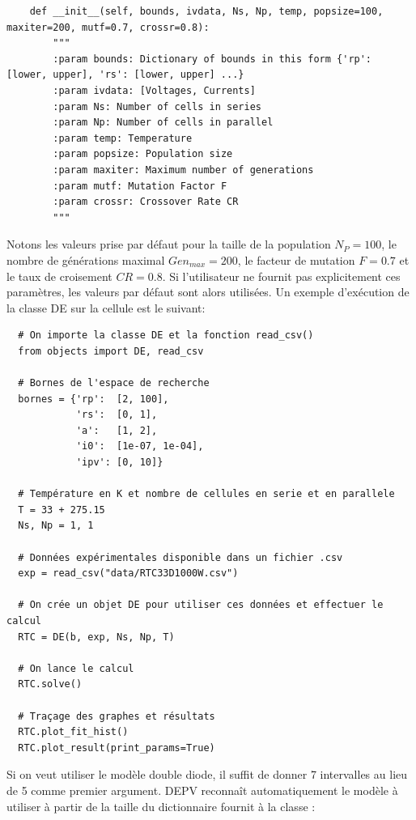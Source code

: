 \begin{verbatim}
    def __init__(self, bounds, ivdata, Ns, Np, temp, popsize=100, maxiter=200, mutf=0.7, crossr=0.8):
        """
        :param bounds: Dictionary of bounds in this form {'rp': [lower, upper], 'rs': [lower, upper] ...}
        :param ivdata: [Voltages, Currents]
        :param Ns: Number of cells in series
        :param Np: Number of cells in parallel
        :param temp: Temperature
        :param popsize: Population size
        :param maxiter: Maximum number of generations
        :param mutf: Mutation Factor F
        :param crossr: Crossover Rate CR
        """
\end{verbatim}
Notons les valeurs prise par défaut pour la taille de la population $N_P = 100$, le nombre de générations maximal $Gen_{max} = 200$, le facteur de mutation $F = 0.7$ et le taux de croisement $CR = 0.8$. Si l'utilisateur ne fournit pas explicitement ces paramètres, les valeurs par défaut sont alors utilisées.
Un exemple d'exécution de la classe DE sur la cellule est le suivant:
\begin{verbatim}
  # On importe la classe DE et la fonction read_csv()
  from objects import DE, read_csv

  # Bornes de l'espace de recherche
  bornes = {'rp':  [2, 100],
            'rs':  [0, 1],
            'a':   [1, 2],
            'i0':  [1e-07, 1e-04],
            'ipv': [0, 10]}
  
  # Température en K et nombre de cellules en serie et en parallele
  T = 33 + 275.15
  Ns, Np = 1, 1

  # Données expérimentales disponible dans un fichier .csv
  exp = read_csv("data/RTC33D1000W.csv")

  # On crée un objet DE pour utiliser ces données et effectuer le calcul
  RTC = DE(b, exp, Ns, Np, T)

  # On lance le calcul
  RTC.solve()

  # Traçage des graphes et résultats
  RTC.plot_fit_hist()
  RTC.plot_result(print_params=True)
\end{verbatim}
Si on veut utiliser le modèle double diode, il suffit de donner 7 intervalles au lieu de 5 comme premier argument. DEPV reconnaît automatiquement le modèle à utiliser à partir de la taille du dictionnaire  fournit à la classe :
